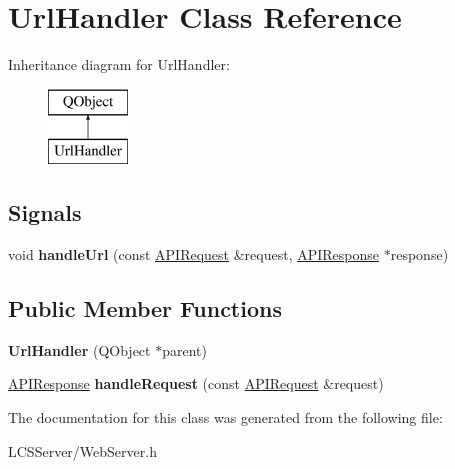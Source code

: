 \hypertarget{class_url_handler}{}\section{Url\+Handler Class Reference}
\label{class_url_handler}
Inheritance diagram for Url\+Handler\+:\begin{figure}[H]
\begin{center}
\leavevmode
\includegraphics[height=2.000000cm]{class_url_handler}
\end{center}
\end{figure}
\subsection*{Signals}
\begin{DoxyCompactItemize}
\item 
\mbox{\label{class_url_handler_a1a519a9fc5c6e07736f430fb02719b4d}} 
void {\bfseries handle\+Url} (const \hyperlink{class_a_p_i_request}{A\+P\+I\+Request} \&request, \hyperlink{class_a_p_i_response}{A\+P\+I\+Response} $\ast$response)
\end{DoxyCompactItemize}
\subsection*{Public Member Functions}
\begin{DoxyCompactItemize}
\item 
\mbox{\label{class_url_handler_a69512a069b2c7e6c74c47ee7894744a0}} 
{\bfseries Url\+Handler} (Q\+Object $\ast$parent)
\item 
\mbox{\label{class_url_handler_a2c3f0bc7731a1eb5d732378c3c876043}} 
\hyperlink{class_a_p_i_response}{A\+P\+I\+Response} {\bfseries handle\+Request} (const \hyperlink{class_a_p_i_request}{A\+P\+I\+Request} \&request)
\end{DoxyCompactItemize}


The documentation for this class was generated from the following file\+:\begin{DoxyCompactItemize}
\item 
L\+C\+S\+Server/Web\+Server.\+h\end{DoxyCompactItemize}
